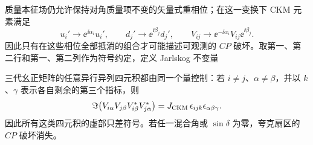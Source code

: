 \begin{definition}[重相位不变量]
质量本征场仍允许保持对角质量项不变的矢量式重相位；在这一变换下 CKM 元素满足
\begin{equation}
{
 u_i'\to \ee^{\ii\alpha_i}u_i',\qquad
 d_j'\to \ee^{\ii\beta_j}d_j',\qquad
 V_{ij}\to \ee^{-\ii\alpha_i}V_{ij}\ee^{\ii\beta_j}.}
\label{eq:ckm-rephasing-dp68}
\end{equation}
因此只有在这些相位全部抵消的组合才可能描述可观测的 $CP$ 破坏。取第一、第二行和第一、第二列作为符号约定，定义 Jarlskog 不变量

三代幺正矩阵的任意异行异列四元积都由同一个量控制：若 $i\neq j$、$\alpha\neq\beta$，并以 $k$、$\gamma$ 表示各自剩余的第三个指标，则
\begin{equation*}
 \Im\!\left(V_{i\alpha}V_{j\beta}V_{i\beta}^*V_{j\alpha}^*\right)
 =J_{\rm CKM}\,\epsilon_{ijk}\epsilon_{\alpha\beta\gamma}.
\end{equation*}
因此所有这类四元积的虚部只差符号。若任一混合角或 $\sin\delta$ 为零，夸克扇区的 $CP$ 破坏消失。

\end{definition}

